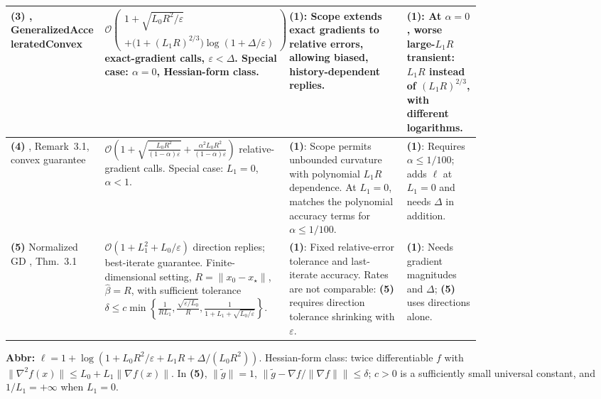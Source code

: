 \begin{table}[tp]
\begin{threeparttable}
\begin{tabularx}{\linewidth}{@{}>{\raggedright\arraybackslash}p{0.20\linewidth}>{\raggedright\arraybackslash}p{0.32\linewidth}>{\raggedright\arraybackslash}p{0.25\linewidth}>{\raggedright\arraybackslash}X@{}}
\midrule
\textbf{(3)} \citep{rgscExactRepository}, Generalized\allowbreak Accelerated\allowbreak Convex & $\mathcal{O}\!\left(\begin{gathered}1+\sqrt{L_0R^2/\varepsilon}\\ +\bigl(1+(L_1R)^{2/3}\bigr)\log(1+\Delta/\varepsilon)\end{gathered}\right)$ exact-gradient calls, $\varepsilon<\Delta$. Special case: $\alpha=0$, Hessian-form class. & \textbf{(1)}: Scope extends exact gradients to relative errors, allowing biased, history-dependent replies. & \textbf{(1)}: At $\alpha=0$, worse large-$L_1R$ transient: $L_1R$ instead of $(L_1R)^{2/3}$, with different logarithms. \\
\midrule
\textbf{(4)} \citep{rgscVasin2026v1}, Remark~3.1, convex guarantee & $\mathcal{O}\!\left(1+\sqrt{\frac{L_0R^2}{(1-\alpha)\varepsilon}}+\frac{\alpha^2L_0R^2}{(1-\alpha)\varepsilon}\right)$ relative-gradient calls. Special case: $L_1=0$, $\alpha<1$. & \textbf{(1)}: Scope permits unbounded curvature with polynomial $L_1R$ dependence. At $L_1=0$, matches the polynomial accuracy terms for $\alpha\le1/100$. & \textbf{(1)}: Requires $\alpha\le1/100$; adds $\ell$ at $L_1=0$ and needs $\Delta$ in addition. \\
\midrule
\textbf{(5)} Normalized GD \citep{rgscKovalev2026v2}, Thm.~3.1 & $\mathcal{O}(1+L_1^2+L_0/\varepsilon)$ direction replies; best-iterate guarantee. Finite-dimensional setting, $R=\|x_0-x_\star\|$, $\hat\beta=R$, with sufficient tolerance
$\delta\le c\min\!\left\{\frac{1}{RL_1},\frac{\sqrt{\varepsilon/L_0}}{R},\frac{1}{1+L_1+\sqrt{L_0/\varepsilon}}\right\}$. & \textbf{(1)}: Fixed relative-error tolerance and last-iterate accuracy. Rates are not comparable: \textbf{(5)} requires direction tolerance shrinking with $\varepsilon$. & \textbf{(1)}: Needs gradient magnitudes and $\Delta$; \textbf{(5)} uses directions alone. \\
\bottomrule
\end{tabularx}
\begin{tablenotes}[flushleft]\footnotesize
\item[] \textbf{Abbr:} $\ell=1+\log(1+L_0R^2/\varepsilon+L_1R+\Delta/(L_0R^2))$. Hessian-form class: twice differentiable $f$ with $\|\nabla^2f(x)\|\le L_0+L_1\|\nabla f(x)\|$. In \textbf{(5)}, $\|\tilde g\|=1$, $\|\tilde g-\nabla f/\|\nabla f\|\|\le\delta$; $c>0$ is a sufficiently small universal constant, and $1/L_1=+\infty$ when $L_1=0$.
\end{tablenotes}
\end{threeparttable}
\end{table}
